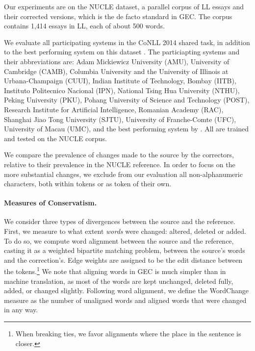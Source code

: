 \documentclass[letter,11pt]{article}
\newcommand{\oa}[1]{\footnote{\color{red}OA: #1}}
\begin{document}
Our experiments are on the NUCLE dataset,
a parallel corpus of LL essays and their corrected versions,
which is the de facto standard in GEC.
The corpus contains 1,414 essays in LL, each of about 500 words.

We evaluate all participating systems in the CoNLL 2014 shared task,
in addition to the best performing system on this dataset \cite{rozovskaya2014building}.
The particiapting systems and their abbreviations are: Adam Mickiewicz University (AMU),
University of Cambridge (CAMB), Columbia University and the University of Illinois at Urbana-Champaign (CUUI),
Indian Institute of Technology, Bombay (IITB), Instituto Politecnico Nacional (IPN),
National Tsing Hua University (NTHU), Peking University (PKU), Pohang University of Science and Technology (POST),
Research Institute for Artificial Intelligence, Romanian Academy (RAC), Shanghai Jiao Tong University (SJTU),
University of Franche-Comte (UFC), University of Macau (UMC),
and the best performing system by .
All are trained and tested on the NUCLE corpus.

We compare the prevalence of changes made to the source by the correctors,
relative to their prevalence in the NUCLE reference.
In order to focus on the more substantial changes, we exclude from our evaluation
all non-alphanumeric characters, both within tokens or as token of their own.



\paragraph{Measures of Conservatism.}
We consider three types of divergences between the source and the reference.
First, we measure to what extent \emph{words} were changed: altered, deleted or added.
To do so, we compute word alignment between the source and the reference, casting it
as a weighted bipartite matching problem, between the source's words and the correction's. 
Edge weights are assigned to be the edit distance
between the tokens.\footnote{When breaking ties, we favor alignments where the place in the sentence is closer.}
We note that aligning words in GEC is much simpler than in machine translation,
as most of the words are kept unchanged, deleted fully, added, or changed slightly.
Following word alignment, we define the {\sc WordChange} measure
as the number of unaligned words and aligned words that were changed in any way.
\end{document}
